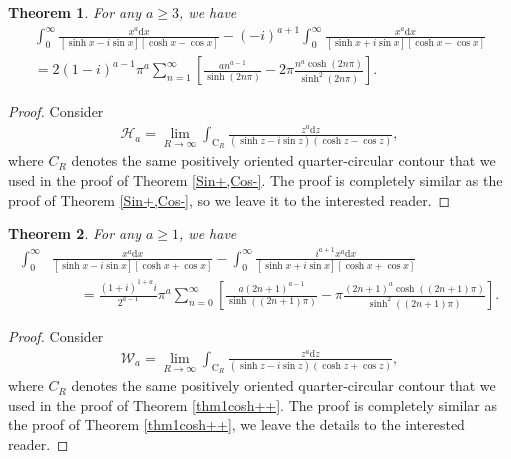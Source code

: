\documentclass[11pt]{article}
\theoremstyle{plain}
\newtheorem{thm}{Theorem}[section]
\theoremstyle{definition}
\begin{document}
\begin{thm}\label{Sin-,Cos-}
For any  $a\ge3$, we have
\begin{align}\label{sincosh--}
\int_0^{\infty}{\frac{x^a\mathrm{d}x}{\left[ \sinh x-i\sin x \right] \left[ \cosh x-\cos x \right]}}-\left( -i \right) ^{a+1}\int_0^{\infty}{\frac{x^a\mathrm{d}x}{\left[ \sinh x+i\sin x \right] \left[ \cosh x-\cos x \right]}}
\nonumber\\
=2\left( 1-i \right) ^{a-1}\pi ^a\sum_{n=1}^{\infty}{\left[ \frac{an^{a-1}}{\sinh \left( 2n\pi \right)}-2\pi \frac{n^a\cosh \left( 2n\pi \right)}{\sinh ^2\left( 2n\pi \right)} \right]}.
\end{align}	
\end{thm}
\begin{proof}
Consider
\begin{align}\label{equations ,sinh,even}
\mathscr{H} _a=\lim_{R\rightarrow \infty} \int_{\mathrm{C}_R}^{}{\frac{z^a\mathrm{d}z}{\left( \sinh z-i\sin z \right) \left( \cosh z-\cos z \right)}},
\end{align}
where $C_R$ denotes the same positively oriented quarter-circular contour that we used in the proof of Theorem \ref{Sin+,Cos-}. 	
The proof is completely similar as the proof of Theorem \ref{Sin+,Cos-}, so we leave it to the interested reader.
\end{proof}

\begin{thm}\label{Sin-,Cos+}
For any  $a\ge 1$, we have
\begin{align}\label{onecosh-+}
\int_0^{\infty}&{\frac{x^a\mathrm{d}x}{\left[ \sinh x-i\sin x \right] \left[ \cosh x+\cos x \right]}}-\int_0^{\infty}{\frac{i^{a+1}x^a\mathrm{d}x}{\left[ \sinh x+i\sin x \right] \left[ \cosh x+\cos x \right]}}
\nonumber\\
&
\quad\quad	=\frac{\left( 1+i \right) ^{1+a}i}{2^{a-1}}\pi ^a\sum_{n=0}^{\infty}{\left[ \frac{a\left( 2n+1 \right) ^{a-1}}{\sinh \left( \left( 2n+1 \right) \pi \right)}-\pi \frac{\left( 2n+1 \right) ^a\cosh \left( \left( 2n+1 \right) \pi \right)}{\sinh ^2\left( \left( 2n+1 \right) \pi \right)} \right]}.
\end{align}
\end{thm}
\begin{proof}
Consider
\begin{align}\label{equations ,sinh,odd}
\mathscr{W} _a=\lim_{R\rightarrow \infty} \int_{\mathrm{C}_R}^{}{\frac{z^a\mathrm{d}z}{\left( \sinh z-i\sin z \right) \left( \cosh z+\cos z \right)}},
\end{align}
where $C_R$ denotes the same positively oriented quarter-circular contour that we used in the proof of Theorem \ref{thm1cosh++}.
The proof is completely similar as the proof of Theorem \ref{thm1cosh++}, we leave the details to the interested reader.
\end{proof}
\end{document}
